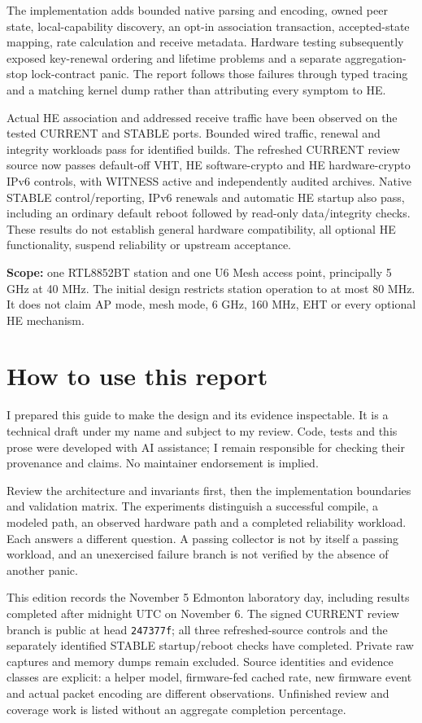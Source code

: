 \documentclass[11pt,letterpaper,oneside]{article}
\newcommand{\code}[1]{\texttt{\small #1}}
\begin{document}
The implementation adds bounded native parsing and encoding, owned peer state, local-capability discovery, an opt-in association transaction, accepted-state mapping, rate calculation and receive metadata. Hardware testing subsequently exposed key-renewal ordering and lifetime problems and a separate aggregation-stop lock-contract panic. The report follows those failures through typed tracing and a matching kernel dump rather than attributing every symptom to HE.

Actual HE association and addressed receive traffic have been observed on the tested CURRENT and STABLE ports. Bounded wired traffic, renewal and integrity workloads pass for identified builds. The refreshed CURRENT review source now passes default-off VHT, HE software-crypto and HE hardware-crypto IPv6 controls, with WITNESS active and independently audited archives. Native STABLE control/reporting, IPv6 renewals and automatic HE startup also pass, including an ordinary default reboot followed by read-only data/integrity checks. These results do not establish general hardware compatibility, all optional HE functionality, suspend reliability or upstream acceptance.

\textbf{Scope:} one RTL8852BT station and one U6 Mesh access point, principally 5 GHz at 40 MHz. The initial design restricts station operation to at most 80 MHz. It does not claim AP mode, mesh mode, 6 GHz, 160 MHz, EHT or every optional HE mechanism.
\clearpage
\section*{How to use this report}
I prepared this guide to make the design and its evidence inspectable. It is a technical draft under my name and subject to my review. Code, tests and this prose were developed with AI assistance; I remain responsible for checking their provenance and claims. No maintainer endorsement is implied.

Review the architecture and invariants first, then the implementation boundaries and validation matrix. The experiments distinguish a successful compile, a modeled path, an observed hardware path and a completed reliability workload. Each answers a different question. A passing collector is not by itself a passing workload, and an unexercised failure branch is not verified by the absence of another panic.

This edition records the November 5 Edmonton laboratory day, including results completed after midnight UTC on November 6. The signed CURRENT review branch is public at head \code{247377f}; all three refreshed-source controls and the separately identified STABLE startup/reboot checks have completed. Private raw captures and memory dumps remain excluded. Source identities and evidence classes are explicit: a helper model, firmware-fed cached rate, new firmware event and actual packet encoding are different observations. Unfinished review and coverage work is listed without an aggregate completion percentage.
\clearpage
{\small\setlength{\parskip}{0pt}\tableofcontents}
\clearpage{}
\end{document}
